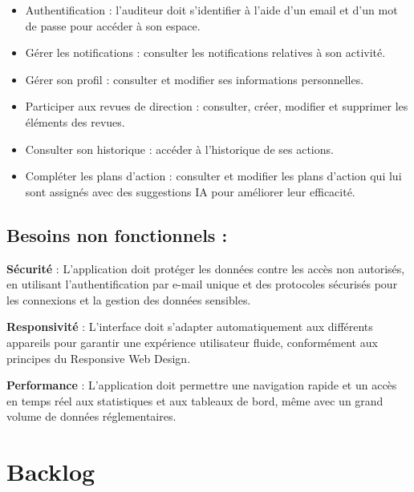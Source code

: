 \begin{itemize}
  \item Authentification : l'auditeur doit s'identifier à l'aide d'un email et d'un mot de passe pour accéder à son espace.
  \item Gérer les notifications : consulter les notifications relatives à son activité.
  \item Gérer son profil : consulter et modifier ses informations personnelles.
  \item Participer aux revues de direction : consulter, créer, modifier et supprimer les éléments des revues.
  \item Consulter son historique : accéder à l'historique de ses actions.
  \item Compléter les plans d'action : consulter et modifier les plans d'action qui lui sont assignés avec des suggestions IA pour améliorer leur efficacité.
\end{itemize}


\subsection{Besoins non fonctionnels :}

\noindent \textbf{Sécurité} : L'application doit protéger les données contre les accès non autorisés, en utilisant l'authentification par e-mail unique et des protocoles sécurisés pour les connexions et la gestion des données sensibles.

\noindent\textbf{Responsivité} : L'interface doit s'adapter automatiquement aux différents appareils pour garantir une expérience utilisateur fluide, conformément aux principes du Responsive Web Design.

\noindent\textbf{Performance} : L'application doit permettre une navigation rapide et un accès en temps réel aux statistiques et aux tableaux de bord, même avec un grand volume de données réglementaires.

\section{Backlog}

